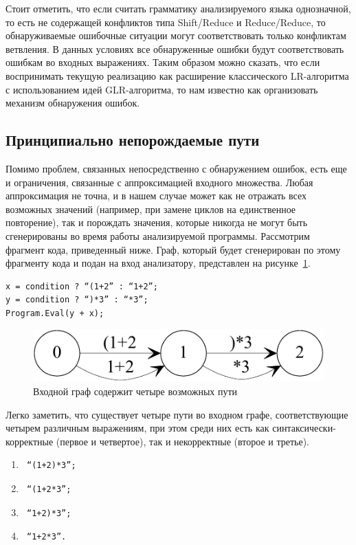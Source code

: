 Стоит отметить, что если считать грамматику анализируемого языка однозначной, то 
есть не содержащей конфликтов типа Shift/Reduce и Reduce/Reduce, то обнаруживаемые 
ошибочные ситуации могут соответствовать только конфликтам ветвления. В данных 
условиях все обнаруженные ошибки будут соответствовать ошибкам во входных выражениях. 
Таким образом можно сказать, что если воспринимать текущую реализацию как расширение 
классического LR-алгоритма с использованием идей GLR-алгоритма, то нам известно 
как организовать механизм обнаружения ошибок. 

\subsection{Принципиально непорождаемые пути}
Помимо проблем, связанных непосредственно с обнаружением ошибок, есть еще и 
ограничения, связанные с аппроксимацией входного множества. Любая аппроксимация 
не точна, и в нашем случае может как не отражать всех возможных значений (например, 
при замене циклов на единственное повторение), так и порождать значения, которые 
никогда не могут быть сгенерированы во время работы анализируемой программы. 
Рассмотрим фрагмент кода, приведенный ниже. Граф, который будет сгенерирован по 
этому фрагменту кода и подан на вход анализатору, представлен на рисунке~\ref{instead}.

\begin{verbatim}
x = condition ? “(1+2” : “1+2”;
y = condition ? “)*3” : “*3”;
Program.Eval(y + x);
\end{verbatim}

\begin{figure}[h]
 \label{instead}
 \centering
 \includegraphics[width=0.5\linewidth]{Verbitskaia/4insteadOf2.pdf}
 \caption{Входной граф содержит четыре возможных пути}
 \label{instead}
\end{figure}

Легко заметить, что существует четыре пути во входном графе, соответствующие 
четырем различным выражениям, при этом среди них есть как синтаксически-корректные 
(первое и четвертое), так и некорректные (второе и третье).

\begin{enumerate}
    \item \begin{verbatim} “(1+2)*3”; \end{verbatim}
    \item \begin{verbatim} “(1+2*3”; \end{verbatim}
    \item \begin{verbatim} “1+2)*3”; \end{verbatim}
    \item \begin{verbatim} “1+2*3”. \end{verbatim}
\end{enumerate}

